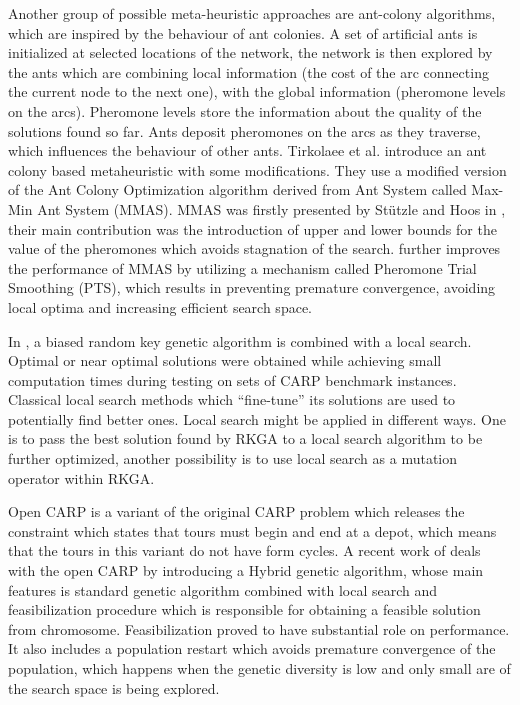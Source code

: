 \documentclass[twoside]{ctuthesis}
\theoremstyle{plain}
\theoremstyle{definition}
\theoremstyle{note}
\begin{document}
Another group of possible meta-heuristic approaches are ant-colony algorithms, which are inspired by the behaviour of ant colonies. A set of artificial ants is initialized at selected locations of the network, the network is then explored by the ants which are combining local information (the cost of the arc connecting the current node to the next one), with the global information (pheromone levels on the arcs). Pheromone levels store the information about the quality of the solutions found so far. Ants deposit pheromones on the arcs as they traverse, which influences the behaviour of other ants. 
Tirkolaee et al. \cite{TIRKOLAEE2019457} introduce an ant colony based metaheuristic with some modifications. They use a modified version of the Ant Colony Optimization algorithm derived from Ant System called Max-Min Ant System (MMAS). MMAS was firstly presented by Stützle and Hoos in \cite{stutzle2000max}, their main contribution was the introduction of upper and lower bounds for the value of the pheromones which avoids stagnation of the search. \cite{TIRKOLAEE2019457} further improves the performance of MMAS by utilizing a mechanism called Pheromone Trial Smoothing (PTS), which results in preventing premature convergence, avoiding local optima and increasing efficient search space.

In \cite{martinez2011brkga}, a biased random key genetic algorithm is combined with a local search. Optimal or near optimal solutions were obtained while achieving small computation times during testing on sets of CARP benchmark instances. Classical local search methods which “fine-tune” its solutions are used to potentially find better ones. Local search might be applied in different ways. One is to pass the best solution found by RKGA to a local search algorithm to be further optimized, another possibility is to use local search as a mutation operator within RKGA.

Open CARP is a variant of the original CARP problem which releases the constraint which states that tours must begin and end at a depot, which means that the tours in this variant do not have form cycles. A recent work of \cite{arakaki2018hybrid} deals with the open CARP by introducing a Hybrid genetic algorithm, whose main features is standard genetic algorithm combined with local search and feasibilization procedure which is responsible for obtaining a feasible solution from chromosome. Feasibilization proved to have substantial role on performance. It also includes a population restart which avoids premature convergence of the population, which happens when the genetic diversity is low and only small are of the search space is being explored.
\end{document}
